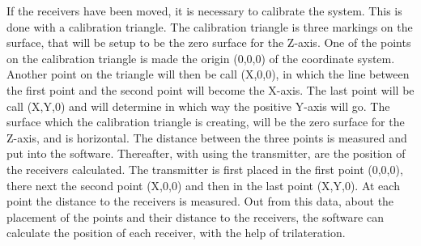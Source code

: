 If the receivers have been moved, it is necessary to calibrate the system. This is done with a calibration triangle. The calibration triangle is three markings on the surface, that will be setup to be the zero surface for the Z-axis. One of the points on the calibration triangle is made the origin (0,0,0) of the coordinate system. Another point on the triangle will then be call (X,0,0), in which the line between the first point and the second point will become the X-axis. The last point will be call (X,Y,0) and will determine in which way the positive Y-axis will go. The surface which the calibration triangle is creating, will be the zero surface for the Z-axis, and is horizontal. The distance between the three points is measured and put into the software. Thereafter, with using the transmitter, are the position of the receivers calculated.  The transmitter is first placed in the first point (0,0,0), there next the second point (X,0,0) and then in the last point (X,Y,0). At each point the distance to the receivers is measured. Out from this data, about the placement of the points and their distance to the receivers, the software can calculate the position of each receiver, with the help of trilateration. \\\\




